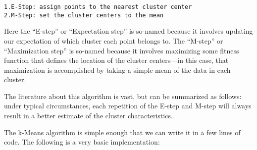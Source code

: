 \documentclass[11pt]{article}
\begin{document}
\begin{verbatim}
1.E-Step: assign points to the nearest cluster center
2.M-Step: set the cluster centers to the mean 
\end{verbatim}

Here the ``E-step'' or ``Expectation step'' is so-named because it
involves updating our expectation of which cluster each point belongs
to. The ``M-step'' or ``Maximization step'' is so-named because it
involves maximizing some fitness function that defines the location of
the cluster centers---in this case, that maximization is accomplished by
taking a simple mean of the data in each cluster.

The literature about this algorithm is vast, but can be summarized as
follows: under typical circumstances, each repetition of the E-step and
M-step will always result in a better estimate of the cluster
characteristics.

    The k-Means algorithm is simple enough that we can write it in a few
lines of code. The following is a very basic implementation:
\end{document}
